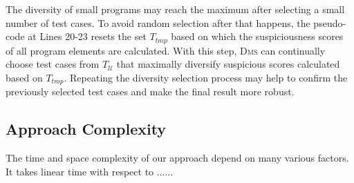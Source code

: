 The diversity of small programs may reach the maximum after selecting a small number of test cases. To avoid random selection
after that happens, the pseudo-code at Lines 20-23 resets the set $T_{tmp}$
based on which the suspiciousness scores of all program elements are calculated. With this step, \textsc{Dms} can
continually choose test cases from $T_{\mathcal{U}}$ that maximally diversify suspicious scores calculated based on $T_{tmp}$.
Repeating the diversity selection process may help to confirm the previously selected test cases and make the final result more robust.






\subsection{Approach Complexity}

The time and space complexity of our approach depend on many various factors. It takes linear time with respect to ......
